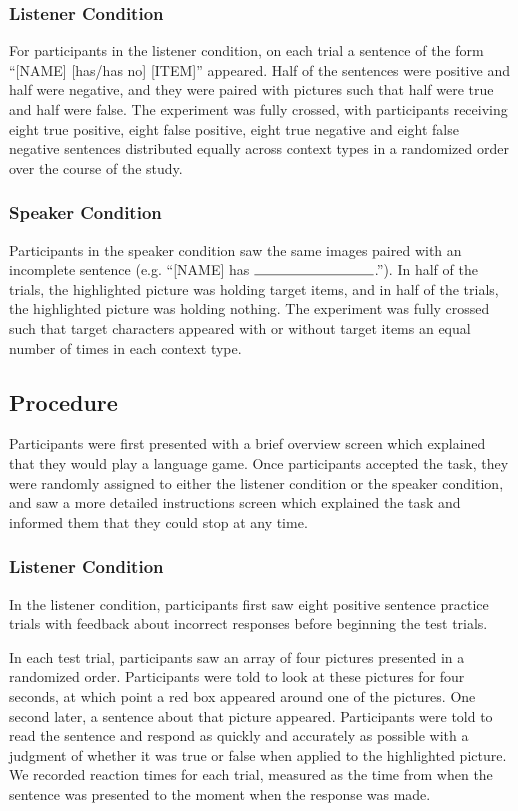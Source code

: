 \documentclass[man]{apa2}
\begin{document}
\subsubsection{Listener Condition}
For participants in the listener condition, on each trial a sentence of the form ``[NAME] [has/has no] [ITEM]'' appeared.  Half of the sentences were positive and half were negative, and they were paired with pictures such that half were true and half were false.  The experiment was fully crossed, with participants receiving eight true positive, eight false positive, eight true negative and eight false negative sentences distributed equally across context types in a randomized order over the course of the study.  

\subsubsection{Speaker Condition}
Participants in the speaker condition saw the same images paired with an incomplete sentence (e.g. ``[NAME] has $\rule{3cm}{0.15mm}$.''). In half of the trials, the highlighted picture was holding target items, and in half of the trials, the highlighted picture was holding nothing.  The experiment was fully crossed such that target characters appeared with or without target items an equal number of times in each context type.  

\subsection{Procedure}
Participants were first presented with a brief overview screen which explained that they would play a language game.  Once participants accepted the task, they were randomly assigned to either the listener condition or the speaker condition, and saw a more detailed instructions screen which explained the task and informed them that they could stop at any time.  

\subsubsection{Listener Condition}

In the listener condition, participants first saw eight positive sentence practice trials with feedback about incorrect responses before beginning the test trials. 

In each test trial, participants saw an array of four pictures presented in a randomized order.  Participants were told to look at these pictures for four seconds, at which point a red box appeared around one of the pictures.  One second later, a sentence about that picture appeared.  Participants were told to read the sentence and respond as quickly and accurately as possible with a judgment of whether it was true or false when applied to the highlighted picture.  We recorded reaction times for each trial, measured as the time from when the sentence was presented to the moment when the response was made.
\end{document}
